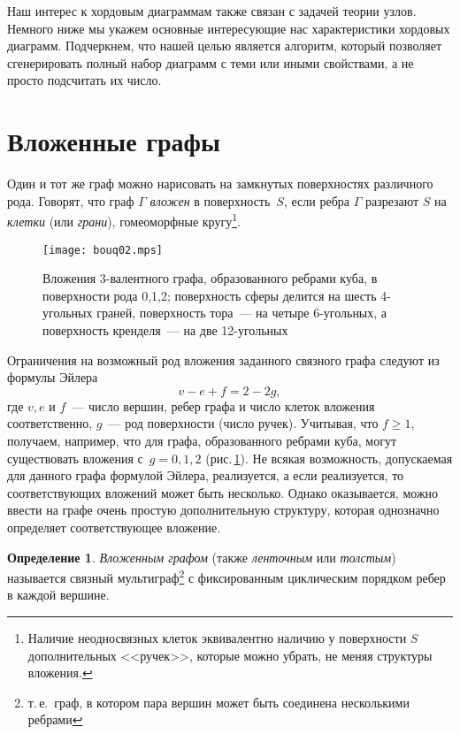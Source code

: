 \documentclass[a4paper,12pt]{article}
\def\figureref#1{рис.\,\protect\ref{#1}}
\let\picref=\figureref
\theoremstyle{plain}
\theoremstyle{definition}
\newtheorem{definition}{Определение}
\begin{document}
Наш интерес к хордовым диаграммам также связан с задачей теории узлов. Немного ниже мы укажем основные интересующие нас
характеристики хордовых диаграмм. Подчеркнем, что нашей целью является алгоритм, который позволяет сгенерировать полный набор
диаграмм с теми или иными свойствами, а не просто подсчитать их число.

\section{Вложенные графы}

Один и тот же граф можно нарисовать на замкнутых поверхностях различного рода. Говорят, что граф $\Gamma$ \textit{вложен} в
поверхность~$S$, если ребра $\Gamma$ разрезают $S$ на \textit{клетки} (или \textit{грани}), гомеоморфные кругу\footnote{Наличие
неодносвязных клеток эквивалентно наличию у поверхности $S$ дополнительных <<ручек>>, которые можно убрать, не меняя структуры
вложения.}.
\begin{figure}[ht]
\centering
\texttt{[image: bouq02.mps]}
\caption{\footnotesize Вложения 3-валентного графа, образованного ребрами куба, в поверхности рода 0,1,2;
поверхность сферы делится на шесть 4-угольных граней, поверхность тора~--- на четыре 6-угольных,
а поверхность кренделя~--- на две 12-угольных
\label{figure:cube}}
\end{figure}
Ограничения на возможный род вложения заданного связного графа следуют из формулы Эйлера
$$
v-e+f=2-2g,
$$
где $v,e$ и $f$~--- число вершин, ребер графа и число клеток вложения соответственно, $g$~--- род поверхности (число ручек).
Учитывая, что $f\ge1$, получаем, например, что для графа, образованного ребрами куба, могут существовать вложения с~$g=0,1,2$
(\picref{figure:cube}). Не всякая возможность, допускаемая для данного графа формулой Эйлера, реализуется, а если реализуется,
то соответствующих вложений может быть несколько. Однако оказывается, можно ввести на графе очень простую дополнительную
структуру, которая однозначно определяет соответствующее вложение.
\begin{definition}
\textit{Вложенным графом} (также \textit{ленточным} или \textit{толстым}) называется связный мультиграф\footnote{т.\,е.~граф, в
котором пара вершин может быть соединена несколькими ребрами} с фиксированным циклическим порядком ребер в каждой вершине.
\end{definition}
\end{document}
